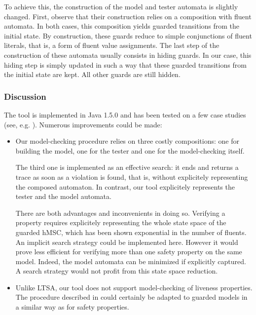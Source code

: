 \begin{itemize}
To achieve this, the construction of the model and tester automata is slightly changed. First, observe that their construction relies on a composition with fluent automata. In both cases, this composition yields guarded transitions from the initial state. By construction, these guards reduce to simple conjunctions of fluent literals, that is, a form of fluent value assignments. The last step of the construction of these automata usually consists in hiding guards. In our case, this hiding step is simply updated in such a way that these guarded transitions from the initial state are kept. All other guards are still hidden. 

\end{itemize}

\subsubsection*{Discussion}

The tool is implemented in Java 1.5.0 and has been tested on a few case studies (see, e.g. \cite{Damas:2010}). Numerous improvements could be made:
\begin{itemize}
\item Our model-checking procedure relies on three costly compositions: one for building the model, one for the tester and one for the model-checking itself. 

The third one is implemented as an effective search: it ends and returns a trace as soon as a violation is found, that is, without explicitely representing the composed automaton. In contrast, our tool explicitely represents the tester and the model automata. 

There are both advantages and inconvenients in doing so. Verifying a property requires explicitely representing the whole state space of the guarded hMSC, which has been shown exponential in the number of fluents. An implicit search strategy could be implemented here. However it would prove less efficient for verifying more than one safety property on the same model. Indeed, the model automata can be minimized if explicitly captured. A search strategy would not profit from this state space reduction.

\item Unlike LTSA, our tool does not support model-checking of liveness properties. The procedure described in \cite{Giannakopoulou:2003} could certainly be adapted to guarded models in a similar way as for safety properties.
\end{itemize}

